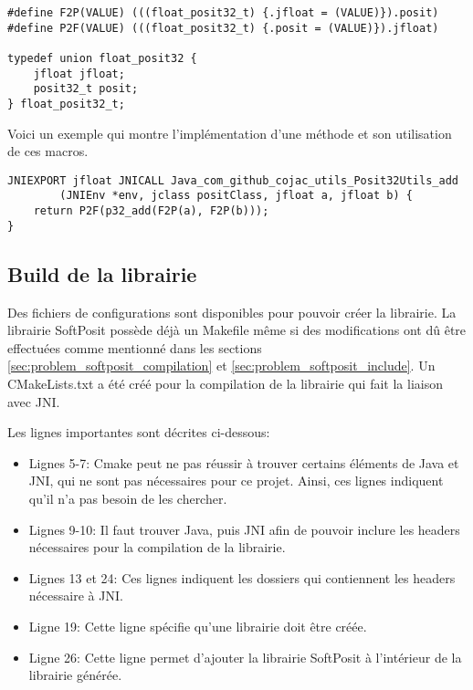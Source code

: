 \begin{verbatim}
#define F2P(VALUE) (((float_posit32_t) {.jfloat = (VALUE)}).posit)
#define P2F(VALUE) (((float_posit32_t) {.posit = (VALUE)}).jfloat)

typedef union float_posit32 {
    jfloat jfloat;
    posit32_t posit;
} float_posit32_t;
\end{verbatim}

Voici un exemple qui montre l'implémentation d'une méthode et son utilisation de ces macros.

\begin{verbatim}
JNIEXPORT jfloat JNICALL Java_com_github_cojac_utils_Posit32Utils_add
        (JNIEnv *env, jclass positClass, jfloat a, jfloat b) {
    return P2F(p32_add(F2P(a), F2P(b)));
}
\end{verbatim}

\subsection{Build de la librairie}

\begin{minipage2}
Des fichiers de configurations sont disponibles pour pouvoir créer la librairie. La librairie \gls{SoftPosit} possède déjà un \gls{Makefile} même si des modifications ont dû être effectuées comme mentionné dans les sections \ref{sec:problem_softposit_compilation} et \ref{sec:problem_softposit_include}. Un CMakeLists.txt a été créé pour la compilation de la librairie qui fait la liaison avec \gls{JNI}.

\end{minipage2}

\begin{minipage2}
Les lignes importantes sont décrites ci-dessous:

\begin{itemize}
    \item Lignes 5-7: Cmake peut ne pas réussir à trouver certains éléments de Java et \gls{JNI}, qui ne sont pas nécessaires pour ce projet. Ainsi, ces lignes indiquent qu'il n'a pas besoin de les chercher.
    \item Lignes 9-10: Il faut trouver Java, puis \gls{JNI} afin de pouvoir inclure les headers nécessaires pour la compilation de la librairie.
    \item Lignes 13 et 24: Ces lignes indiquent les dossiers qui contiennent les headers nécessaire à \gls{JNI}.
    \item Ligne 19: Cette ligne spécifie qu'une librairie doit être créée.
    \item Ligne 26: Cette ligne permet d'ajouter la librairie \gls{SoftPosit} à l'intérieur de la librairie générée.
\end{itemize}
\end{minipage2}

